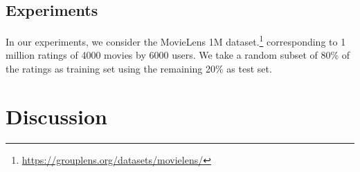 \subsection{Experiments}

In our experiments, we consider the MovieLens 1M dataset.\footnote{\url{https://grouplens.org/datasets/movielens/}} corresponding to 1 million ratings of 4000 movies by 6000 users. We take a random subset of 80\% of the ratings as training set using the remaining 20\% as test set.


\section{Discussion}











